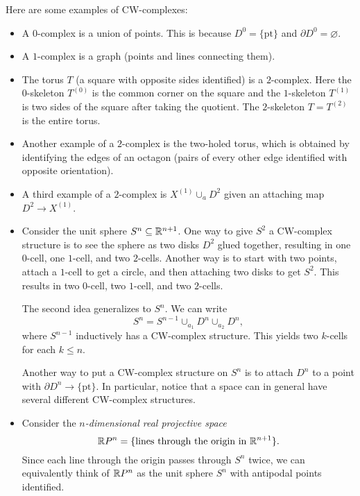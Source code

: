 \begin{example}
  Here are some examples of CW-complexes:
  \begin{itemize}
    \item A $0$-complex is a union of points.
      This is because $D^0 = \{\text{pt}\}$ and
      $\partial D^0 = \varnothing$.
    \item A $1$-complex is a graph (points and lines
      connecting them).
    \item The torus $T$ (a square with opposite sides
      identified) is a $2$-complex. Here
      the $0$-skeleton $T^{(0)}$ is the common corner
      on the square and the $1$-skeleton $T^{(1)}$
      is two sides of the square after taking the
      quotient. The $2$-skeleton $T = T^{(2)}$ is the
      entire torus.
    \item Another example of a $2$-complex is the
      two-holed torus, which is obtained by identifying
      the edges of an octagon (pairs of every other
      edge identified with opposite orientation).
    \item A third example of a $2$-complex is
      $X^{(1)} \cup_a D^2$ given an attaching map
      $D^2 \to X^{(1)}$.
    \item Consider the unit sphere $S^n \subseteq \mathbb{R}^{n + 1}$.
      One way to give $S^2$ a CW-complex structure is
      to see the sphere as two disks $D^2$ glued together,
      resulting in one $0$-cell, one $1$-cell, and two
      $2$-cells. Another way is to start with
      two points, attach a $1$-cell to get a circle,
      and then attaching two disks to get $S^2$. This
      results in two $0$-cell, two $1$-cell, and two
      $2$-cells.

      The second idea generalizes to $S^n$. We can
      write
      \[
        S^n = S^{n - 1} \cup_{a_1} D^n \cup_{a_2} D^n,
      \]
      where $S^{n - 1}$ inductively has a CW-complex
      structure. This yields two $k$-cells for each
      $k \le n$.

      Another way to put a CW-complex structure
      on $S^n$ is to attach $D^n$ to a point with
      $\partial D^n \to \{\text{pt}\}$.
      In particular, notice that a space
      can in general have several different CW-complex
      structures.
    \item Consider the \emph{$n$-dimensional real projective space}
      \[
        \mathbb{R} P^n = \{\text{lines through the origin in } \mathbb{R}^{n + 1}\}.
      \]
      Since each line through the origin passes through
      $S^n$ twice, we can equivalently think of $\mathbb{R} P^n$
      as the unit sphere $S^n$ with antipodal points
      identified.


\end{itemize}
\end{example}
